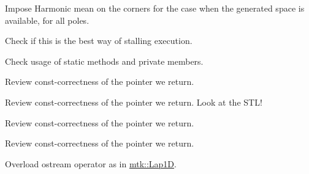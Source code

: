 \begin{DoxyRefList}
\item[\label{todo__todo000023}%
\hypertarget{todo__todo000023}{}%
Member \hyperlink{classmtk_1_1RobinBCDescriptor2D_a2f99cdd8bda2bc46cf259bb96ef4bd49}{mtk\+:\+:Robin\+B\+C\+Descriptor2\+D\+:\+:Impose\+On\+South\+Boundary\+With\+Space} (const Lap2\+D \&lap, const Uni\+Stg\+Grid2\+D \&grid, Dense\+Matrix \&matrix, const Real \&time=k\+Zero) const ]Impose Harmonic mean on the corners for the case when the generated space is available, for all poles.  
\item[\label{todo__todo000025}%
\hypertarget{todo__todo000025}{}%
Member \hyperlink{classmtk_1_1Tools_a332324c6f25e66be9dff48c5987a3b9f}{mtk\+:\+:Tools\+:\+:Prevent} (const bool complement, const char $\ast$const fname, int lineno, const char $\ast$const fxname) noexcept]Check if this is the best way of stalling execution.  
\item[\label{todo__todo000026}%
\hypertarget{todo__todo000026}{}%
Member \hyperlink{classmtk_1_1Tools_a04a60458594336ee1badff79b8a9a77f}{mtk\+:\+:Tools\+:\+:test\+\_\+number\+\_\+} ]Check usage of static methods and private members.  
\item[\label{todo__todo000007}%
\hypertarget{todo__todo000007}{}%
Member \hyperlink{classmtk_1_1UniStgGrid1D_aa1999580cb98c19950e951510871cc90}{mtk\+:\+:Uni\+Stg\+Grid1\+D\+:\+:discrete\+\_\+domain\+\_\+x} () const ]Review const-\/correctness of the pointer we return.  
\item[\label{todo__todo000008}%
\hypertarget{todo__todo000008}{}%
Member \hyperlink{classmtk_1_1UniStgGrid1D_ab9c3f9ee2ac76a351b01e4abfede4d19}{mtk\+:\+:Uni\+Stg\+Grid1\+D\+:\+:discrete\+\_\+field} ()]Review const-\/correctness of the pointer we return. Look at the S\+T\+L!  
\item[\label{todo__todo000010}%
\hypertarget{todo__todo000010}{}%
Member \hyperlink{classmtk_1_1UniStgGrid2D_ab2f70cf5cd0a2d5486992d9f2f8baa4a}{mtk\+:\+:Uni\+Stg\+Grid2\+D\+:\+:discrete\+\_\+domain\+\_\+x} () const ]Review const-\/correctness of the pointer we return.  
\item[\label{todo__todo000011}%
\hypertarget{todo__todo000011}{}%
Member \hyperlink{classmtk_1_1UniStgGrid2D_ac33a58d65105550dcf6f6b92b48b5105}{mtk\+:\+:Uni\+Stg\+Grid2\+D\+:\+:discrete\+\_\+domain\+\_\+y} () const ]Review const-\/correctness of the pointer we return.  
\item[\label{todo__todo000015}%
\hypertarget{todo__todo000015}{}%
File \hyperlink{mtk__div__1d_8cc}{mtk\+\_\+div\+\_\+1d.cc} ]Overload ostream operator as in \hyperlink{classmtk_1_1Lap1D}{mtk\+::\+Lap1\+D}.


\end{DoxyRefList}
